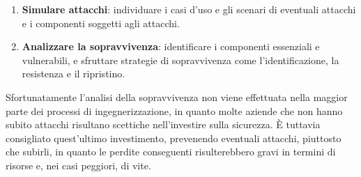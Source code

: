 \begin{solution}
\begin{enumerate}
	\item \textbf{Simulare attacchi}: individuare i casi d'uso e gli scenari di eventuali attacchi e i componenti soggetti agli attacchi.
	\item \textbf{Analizzare la sopravvivenza}: identificare i componenti essenziali e vulnerabili, e sfruttare strategie di sopravvivenza come l'identificazione, la resistenza e il ripristino.
\end{enumerate}
Sfortunatamente l'analisi della sopravvivenza non viene effettuata nella maggior parte dei processi di ingegnerizzazione, in quanto molte aziende che non hanno subito attacchi risultano scettiche nell'investire sulla sicurezza.
È tuttavia consigliato quest'ultimo investimento, prevenendo eventuali attacchi, piuttosto che subirli, in quanto le perdite conseguenti risulterebbero gravi in termini di risorse e, nei casi peggiori, di vite.
\end{solution}